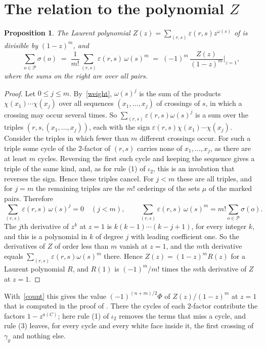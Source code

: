 \documentclass[a4paper]{amsart}
\newtheorem{proposition}[theorem]{Proposition}
\newcommand{\eps}{\varepsilon}
\newcommand{\cP}{\mathcal P}
\begin{document}
\section{The relation to the polynomial $Z$}

\begin{proposition}\label{moment}
The Laurent polynomial $Z(z)=\sum_{(r,s)}\eps(r,s)z^{\omega(s)}$ of \cite{P} is divisible by $(1-z)^m$, and
\[
\sum_{o\in\cP}\sigma(o)\;=\;\frac1{m!}\sum_{(r,s)}\eps(r,s)\,\omega(s)^m\;=\;(-1)^m\,\frac{Z(z)}{(1-z)^m}\bigg|_{z=1},
\]
where the sums on the right are over all pairs.
\end{proposition}

\begin{proof}
Let $0\le j\le m$.
By~\eqref{weight}, $\omega(s)^j$ is the sum of the products $\chi(x_1)\cdots\chi(x_j)$ over all sequences $(x_1,\dots,x_j)$ of crossings of $s$, in which a crossing may occur several times.
So $\sum_{(r,s)}\eps(r,s)\omega(s)^j$ is a sum over the triples $(r,s,(x_1,\dots,x_j))$, each with the sign $\eps(r,s)\chi(x_1)\cdots\chi(x_j)$.
Consider the triples in which fewer than $m$ different crossings occur.
For such a triple some cycle of the $2$-factor of $(r,s)$ carries none of $x_1,\dots,x_j$, as there are at least $m$ cycles.
Reversing the first such cycle and keeping the sequence gives a triple of the same kind, and, as for rule (1) of $\iota_2$, this is an involution that reverses the sign.
Hence these triples cancel.
For $j<m$ these are all triples, and for $j=m$ the remaining triples are the $m!$ orderings of the sets $\mu$ of the marked pairs.
Therefore
\[
\sum_{(r,s)}\eps(r,s)\,\omega(s)^j=0\quad(j<m),\qquad \sum_{(r,s)}\eps(r,s)\,\omega(s)^m=m!\sum_{o\in\cP}\sigma(o).
\]
The $j$th derivative of $z^k$ at $z=1$ is $k(k-1)\cdots(k-j+1)$, for every integer $k$, and this is a polynomial in $k$ of degree $j$ with leading coefficient one.
So the derivatives of $Z$ of order less than $m$ vanish at $z=1$, and the $m$th derivative equals $\sum_{(r,s)}\eps(r,s)\omega(s)^m$ there.
Hence $Z(z)=(1-z)^mR(z)$ for a Laurent polynomial $R$, and $R(1)$ is $(-1)^m/m!$ times the $m$th derivative of $Z$ at $z=1$.
\end{proof}

With~\eqref{count} this gives the value $(-1)^{(n+m)/2}\Phi$ of $Z(z)/(1-z)^m$ at $z=1$ that is computed in the proof of \cite[Proposition~6.9]{P}.
There the cycles of each $2$-factor contribute the factors $1-z^{a(C)}$; here rule (1) of $\iota_2$ removes the terms that miss a cycle, and rule (3) leaves, for every cycle and every white face inside it, the first crossing of $\gamma_y$ and nothing else.
\end{document}
